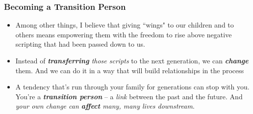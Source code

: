 \documentclass[11pt]{article}
\begin{document}
\subsubsection{Becoming a Transition Person}
\begin{itemize}
\item Among other things, I believe that giving ``wings" to our children and to others means empowering them with the freedom to rise above negative scripting that had been passed down to us. 

\item Instead of \emph{\textbf{transferring} those scripts} to the next generation, we can \emph{\textbf{change}} them. And we can do it in a way that will build relationships in the process

\item A tendency that's run through your family for generations can stop with you. You're a \emph{\textbf{transition person}} -- a \emph{link} between the past and the future. And \emph{your own change can \textbf{affect} many, many lives downstream}.
\end{itemize}
\newpage


\end{document}

